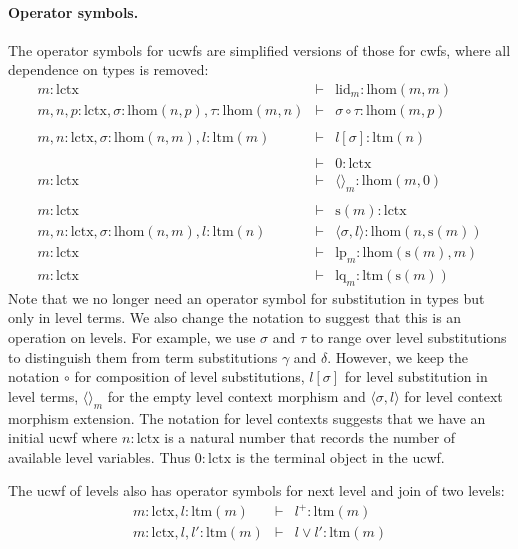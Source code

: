 \documentclass[submission,copyright,creativecommons]{eptcs}
\def\lhom{\mathrm{lhom}}
\def\lctx{\mathrm{lctx}}
\def\ltm{\mathrm{ltm}}
\def\lp{\mathrm{lp}}
\def\lq{\mathrm{lq}}
\def\s{\mathrm{s}}
\def\lid{\mathrm{lid}}
\newcommand{\tuple}[1]{\langle #1 \rangle}
\begin{document}
\paragraph{Operator symbols.} The operator symbols for ucwfs are simplified versions of those for cwfs, where all dependence on types is removed:
\begin{eqnarray*}
m : \lctx &\vdash& \lid_m : \lhom(m,m)\\
m, n, p : \lctx, \sigma : \lhom(n,p), \tau : \lhom(m,n) &\vdash&
\sigma \circ \tau : \lhom(m,p)\\
\\
m,n: \lctx, \sigma : \lhom(n,m), l :\ltm(m) &\vdash&  l[\sigma] : \ltm(n)\\
\\
&\vdash& 0 : \lctx\\
m : \lctx &\vdash& \tuple{}_m : \lhom(m,0)\\
\\
m : \lctx &\vdash& \s(m) : \lctx\\
m,n : \lctx, \sigma : \lhom(n,m), l:\ltm(n) &\vdash& \tuple{\sigma,l} : \lhom(n,\s(m))\\
m : \lctx &\vdash& \lp_m: \lhom(\s(m),m)\\
m : \lctx &\vdash& \lq_m: \ltm(\s(m))
\end{eqnarray*}
Note that we no longer need an operator symbol for substitution in types but only in level terms. We also change the notation to suggest that this is an operation on levels. For example, we use $\sigma$ and $\tau$ to range over level substitutions to distinguish them from term substitutions $\gamma$ and $\delta$. However, we keep the notation $\circ$ for composition of level substitutions, $l[\sigma]$ for level substitution in level terms, $\tuple{}_m$ for the empty level context morphism and $\tuple{\sigma,l}$ for level context morphism extension. The notation for level contexts suggests that we have an initial ucwf where $n : \lctx$ is a natural number that records the number of available level variables. Thus $0 : \lctx$ is the terminal object in the ucwf.

The ucwf of levels also has operator symbols for next level and join of two levels:
\begin{eqnarray*}
m : \lctx, l : \ltm(m) &\vdash& l^+ : \ltm(m)\\
m : \lctx, l,l' : \ltm(m) &\vdash& l \vee l' : \ltm(m)
\end{eqnarray*}
\end{document}
